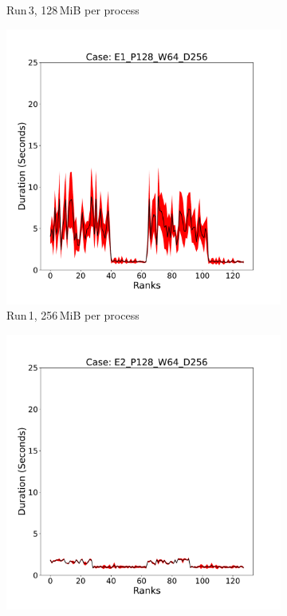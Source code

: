 \begin{figure}
\begin{subfigure}[b]{0.3\textwidth}
         \caption{Run\,3, 128\,MiB per process}
         \label{fig:E3_128_d11}
     \end{subfigure}
     \vfill
     \begin{subfigure}[b]{0.3\textwidth}
         \centering
         \includegraphics[width=\textwidth, height=\textwidth]{figures/deisa1__E1_P128_W64_D256.pdf}
         \caption{Run\,1, 256\,MiB per process }
         \label{fig:E1_256_d11}
     \end{subfigure}
     \hfill
     \begin{subfigure}[b]{0.3\textwidth}
         \centering
         \includegraphics[width=\textwidth, height=\textwidth]{figures/deisa1__E2_P128_W64_D256.pdf}

\end{subfigure}
\end{figure}
